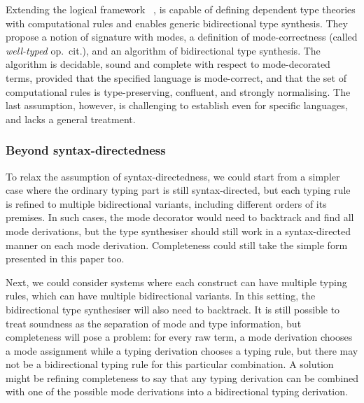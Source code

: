 Extending the logical framework \Dedukti~\cite{Assaf2016},  is capable of defining dependent type theories with computational rules and enables generic bidirectional type synthesis.
They propose a notion of \LF signature with modes, a definition of mode-correctness (called \emph{well-typed} op.\ cit.), and an algorithm of bidirectional type synthesis.
The algorithm is decidable, sound and complete with respect to mode-decorated terms, provided that the specified language is mode-correct, and that the set of computational rules is type-preserving, confluent, and strongly normalising.
The last assumption, however, is challenging to establish even for specific languages, and lacks a general treatment.

\subsubsection{Beyond syntax-directedness}


To relax the assumption of syntax-directedness, we could start from a simpler case where the ordinary typing part is still syntax-directed, but each typing rule is refined to multiple bidirectional variants, including different orders of its premises.
In such cases, the mode decorator would need to backtrack and find all mode derivations, but the type synthesiser should still work in a syntax-directed manner on each mode derivation.
Completeness could still take the simple form presented in this paper too.

Next, we could consider systems where each construct can have multiple typing rules, which can have multiple bidirectional variants.
In this setting, the bidirectional type synthesiser will also need to backtrack.
It is still possible to treat soundness as the separation of mode and type information, but completeness will pose a problem:
for every raw term, a mode derivation chooses a mode assignment while a typing derivation chooses a typing rule, but there may not be a bidirectional typing rule for this particular combination.
A solution might be refining completeness to say that any typing derivation can be combined with one of the possible mode derivations into a bidirectional typing derivation.


